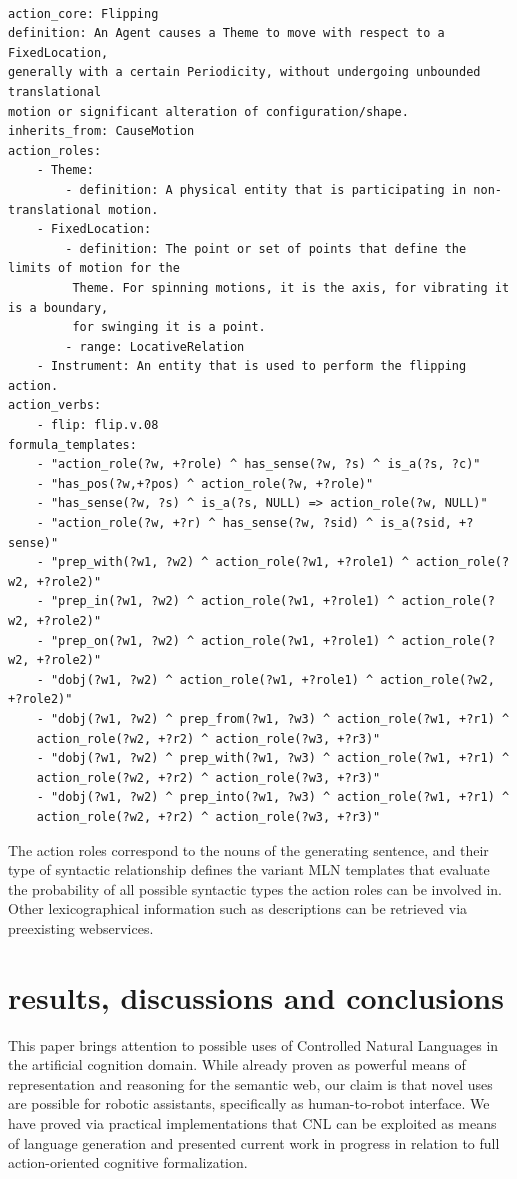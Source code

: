 \documentclass[oribibl]{llncs}
\begin{document}
{\scriptsize

\begin{verbatim}
  
action_core: Flipping
definition: An Agent causes a Theme to move with respect to a FixedLocation, 
generally with a certain Periodicity, without undergoing unbounded translational 
motion or significant alteration of configuration/shape.
inherits_from: CauseMotion
action_roles:
    - Theme:
        - definition: A physical entity that is participating in non-translational motion.
    - FixedLocation:
        - definition: The point or set of points that define the limits of motion for the
         Theme. For spinning motions, it is the axis, for vibrating it is a boundary, 
         for swinging it is a point. 
        - range: LocativeRelation
    - Instrument: An entity that is used to perform the flipping action.
action_verbs:
    - flip: flip.v.08
formula_templates:
    - "action_role(?w, +?role) ^ has_sense(?w, ?s) ^ is_a(?s, ?c)"
    - "has_pos(?w,+?pos) ^ action_role(?w, +?role)"
    - "has_sense(?w, ?s) ^ is_a(?s, NULL) => action_role(?w, NULL)"
    - "action_role(?w, +?r) ^ has_sense(?w, ?sid) ^ is_a(?sid, +?sense)"
    - "prep_with(?w1, ?w2) ^ action_role(?w1, +?role1) ^ action_role(?w2, +?role2)"
    - "prep_in(?w1, ?w2) ^ action_role(?w1, +?role1) ^ action_role(?w2, +?role2)"
    - "prep_on(?w1, ?w2) ^ action_role(?w1, +?role1) ^ action_role(?w2, +?role2)"
    - "dobj(?w1, ?w2) ^ action_role(?w1, +?role1) ^ action_role(?w2, +?role2)"
    - "dobj(?w1, ?w2) ^ prep_from(?w1, ?w3) ^ action_role(?w1, +?r1) ^ 
    action_role(?w2, +?r2) ^ action_role(?w3, +?r3)"
    - "dobj(?w1, ?w2) ^ prep_with(?w1, ?w3) ^ action_role(?w1, +?r1) ^ 
    action_role(?w2, +?r2) ^ action_role(?w3, +?r3)"
    - "dobj(?w1, ?w2) ^ prep_into(?w1, ?w3) ^ action_role(?w1, +?r1) ^ 
    action_role(?w2, +?r2) ^ action_role(?w3, +?r3)"
\end{verbatim}
}
The action roles correspond to the nouns of the generating sentence, and their type of syntactic relationship defines the variant MLN templates that evaluate the probability of all possible syntactic types the action roles can be involved in. Other lexicographical information such as descriptions can be retrieved via preexisting webservices.

\section{results, discussions and conclusions}
This paper brings attention to possible uses of Controlled Natural Languages in the artificial cognition domain. While already proven as powerful means of representation and reasoning for the semantic web\cite{kuhnkaljurandsemantic}, our claim is that novel uses are possible for robotic assistants, specifically as human-to-robot interface.
We have proved via practical implementations that CNL can be exploited as means of language generation and presented current work in progress in relation to full action-oriented cognitive formalization.
\end{document}
